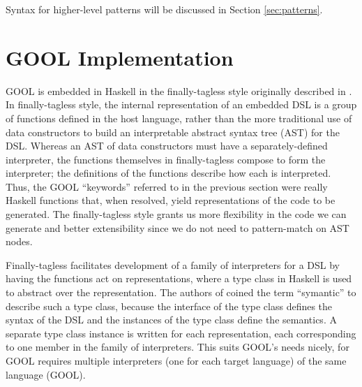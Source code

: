 \documentclass[sigplan,review,anonymous,prologue,dvipsnames]{acmart}
\begin{document}
Syntax for higher-level patterns will be discussed in Section \ref{sec:patterns}.

\section{GOOL Implementation} \label{sec:implementation}

GOOL is embedded in Haskell in the finally-tagless style originally described 
in \cite{carette2009finally}. In finally-tagless style, the internal 
representation of an embedded DSL is a group of functions defined in the host 
language, rather than the more traditional use of data constructors to build an 
interpretable abstract syntax tree (AST) for the DSL. Whereas an AST of data 
constructors must have a separately-defined interpreter, the functions 
themselves in finally-tagless compose to form the interpreter; the definitions 
of the functions describe how each is interpreted. Thus, the GOOL ``keywords'' 
referred to in the previous section were really Haskell functions that, when 
resolved, yield representations of the code to be generated. The 
finally-tagless style grants us more flexibility in the code we can generate 
and better extensibility since we do not need to pattern-match on AST nodes.

Finally-tagless facilitates development of a family of interpreters for a DSL 
by having the functions act on representations, where a type class in Haskell 
is used to abstract over the representation. The authors of 
\cite{carette2009finally} coined the term ``symantic'' to describe such a type 
class, because the interface of the type class defines the syntax of the DSL 
and the instances of the type class define the semantics. A separate type class 
instance is written for each representation, each corresponding to one member 
in the family of interpreters. This suits GOOL's needs nicely, for GOOL 
requires multiple interpreters (one for each target language) of the same 
language (GOOL).
\end{document}
